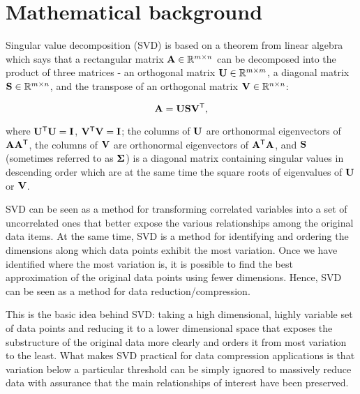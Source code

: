 \section{Mathematical background}
\label{sec:math}


Singular value decomposition (SVD) \cite{Baker2013, Kalman2002} is based on a theorem from linear algebra which says that a rectangular matrix $\mathbf{A} \in \mathbb{R}^{m \times n}$ can be decomposed into the product of three matrices - an orthogonal matrix $\mathbf{U} \in \mathbb{R}^{m \times m}$, a diagonal
matrix $\mathbf{S} \in \mathbb{R}^{m \times n}$, and the transpose of an orthogonal matrix $\mathbf{V} \in \mathbb{R}^{n \times n}$:

\begin{equation}
\mathbf{A} = \mathbf{U} \mathbf{S} \mathbf{V}^\mathsf{T},
\label{eq:svd-def}
\end{equation}

\noindent
where $\mathbf{U^\mathsf{T}U} = \mathbf{I}$, $\mathbf{V^\mathsf{T}V} = \mathbf{I}$; the columns of $\mathbf{U}$ are orthonormal eigenvectors of $\mathbf{AA^\mathsf{T}}$, the columns of $\mathbf{V}$ are orthonormal eigenvectors of $\mathbf{A^\mathsf{T}A}$, and $\mathbf{S}$ (sometimes referred to as $\mathbf{\Sigma}$) is a diagonal matrix containing singular values in descending order which are at the same time the square roots of eigenvalues of $\mathbf{U}$ or $\mathbf{V}$.

SVD can be seen as a method for transforming correlated variables into a set of uncorrelated ones that better expose the various relationships among the original data items. At the same time, SVD is a method for identifying and ordering the dimensions along which data points exhibit the most variation. Once we have identified where the most variation is, it is possible to find the best approximation of the original data points using fewer dimensions. Hence, SVD can be seen as a method for data reduction/compression.

This is the basic idea behind SVD: taking a high dimensional, highly variable set of data points and reducing it to a lower dimensional space that exposes the substructure of the original data more clearly and orders it from most variation to the least. What makes SVD practical for data compression applications is that variation below a particular threshold can be simply ignored to massively reduce data with assurance that the main relationships of interest have been preserved.

